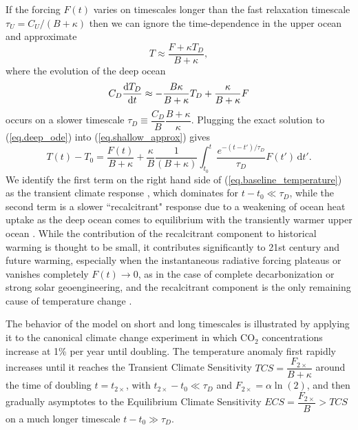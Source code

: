 \documentclass{article}
\begin{document}
If the forcing $F(t)$ varies on timescales longer than the fast relaxation timescale $\tau_{U} = C_{U}/(B + \kappa)$ then we can ignore the time-dependence in the upper ocean and approximate
\begin{equation}
    T \approx \frac{F+\kappa T_{D}}{B + \kappa},
    \label{eq.shallow_approx}
\end{equation}
where the evolution of the deep ocean
\begin{equation}
    C_{D} \dv{T_{D}}{t} \approx - \frac{B \kappa}{B + \kappa} T_{D} + \frac{\kappa}{B + \kappa} F
    \label{eq.deep_ode}
\end{equation}
occurs on a slower timescale $\tau_{D} \equiv \dfrac{C_{D}}{B} \dfrac{B + \kappa}{\kappa}$. Plugging the exact solution to (\ref{eq.deep_ode}) into (\ref{eq.shallow_approx}) gives
\begin{equation}
    T(t) - T_{0} = \frac{F(t)}{B + \kappa} + \frac{\kappa}{B} \frac{1}{(B+\kappa)} \int_{t_{0}}^{t} \frac{ e^{-(t-t')/\tau_{D}}}{\tau_{D}} F(t') \, \text{d}t'.\label{eq.baseline_temperature}
\end{equation}
We identify the first term on the right hand side of (\ref{eq.baseline_temperature}) as the transient climate response \citep{gregory_transient_2008}, which dominates for $t-t_{0} \ll \tau_{D}$, while the second term is a slower ``recalcitrant" response due to a weakening of ocean heat uptake as the deep ocean comes to equilibrium with the transiently warmer upper ocean \citep{held_probing_2010}. While the contribution of the recalcitrant component to historical warming is thought to be small, it contributes significantly to 21st century and future warming, especially when the instantaneous radiative forcing plateaus or vanishes completely $F(t) \rightarrow 0$, as in the case of complete decarbonization or strong solar geoengineering, and the recalcitrant component is the only remaining cause of temperature change \citep{gregory_transient_2008, held_probing_2010}.

The behavior of the model on short and long timescales is illustrated by applying it to the canonical climate change experiment in which CO$_{2}$ concentrations increase at 1\% per year until doubling. The temperature anomaly first rapidly increases until it reaches the Transient Climate Sensitivity $TCS = \dfrac{F_{2\times}}{B + \kappa}$ around the time of doubling $t=t_{2\times}$, with $t_{2\times} - t_{0} \ll \tau_{D}$ and $F_{2\times} = \alpha \ln(2)$, and then gradually asymptotes to the Equilibrium Climate Sensitivity $ECS = \dfrac{F_{2\times}}{B} > TCS$ on a much longer timescale $t-t_{0} \gg \tau_{D}$.
\end{document}
